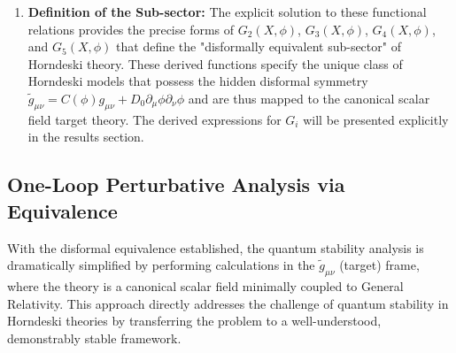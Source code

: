 \documentclass[twocolumn]{aastex631}
\begin{document}
\begin{enumerate}
    \item \textbf{Definition of the Sub-sector:} The explicit solution to these functional relations provides the precise forms of $G_2(X, \phi)$, $G_3(X, \phi)$, $G_4(X, \phi)$, and $G_5(X, \phi)$ that define the "disformally equivalent sub-sector" of Horndeski theory. These derived functions specify the unique class of Horndeski models that possess the hidden disformal symmetry $\tilde{g}_{\mu\nu} = C(\phi) g_{\mu\nu} + D_0 \partial_\mu\phi \partial_\nu\phi$ and are thus mapped to the canonical scalar field target theory. The derived expressions for $G_i$ will be presented explicitly in the results section.
\end{enumerate}

\subsection{One-Loop Perturbative Analysis via Equivalence}
With the disformal equivalence established, the quantum stability analysis is dramatically simplified by performing calculations in the $\tilde{g}_{\mu\nu}$ (target) frame, where the theory is a canonical scalar field minimally coupled to General Relativity. This approach directly addresses the challenge of quantum stability in Horndeski theories by transferring the problem to a well-understood, demonstrably stable framework.
\end{document}
